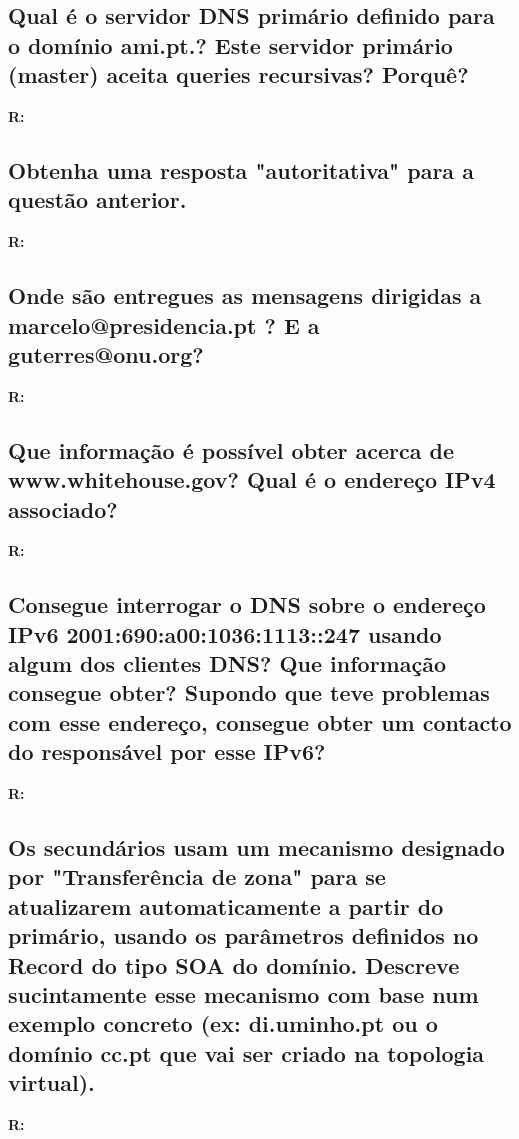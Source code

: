 \documentclass{llncs}
\begin{document}
\subsection{\textbf{Qual é o servidor DNS primário definido para o domínio ami.pt.? Este servidor primário (master) aceita queries recursivas? Porquê?}}
\textbf{R:}


\subsection{\textbf{Obtenha uma resposta "autoritativa" para a questão anterior.}}
\textbf{R:}


\subsection{\textbf{Onde são entregues as mensagens dirigidas a marcelo@presidencia.pt ? E a guterres@onu.org?}}
\textbf{R:}


\subsection{\textbf{Que informação é possível obter acerca de www.whitehouse.gov? Qual é o endereço IPv4 associado?}}
\textbf{R:}


\subsection{\textbf{Consegue interrogar o DNS sobre o endereço IPv6 2001:690:a00:1036:1113::247 usando algum dos clientes DNS? Que informação consegue obter? Supondo que teve problemas com esse endereço, consegue obter um contacto do responsável por esse IPv6?}}
\textbf{R:}


\subsection{\textbf{Os secundários usam um mecanismo designado por "Transferência de zona" para se atualizarem automaticamente a partir do primário, usando os parâmetros definidos no Record do tipo SOA do domínio. Descreve sucintamente esse mecanismo com base num exemplo concreto (ex: di.uminho.pt ou o domínio cc.pt que vai ser criado na topologia virtual).}}
\textbf{R:}
\end{document}
